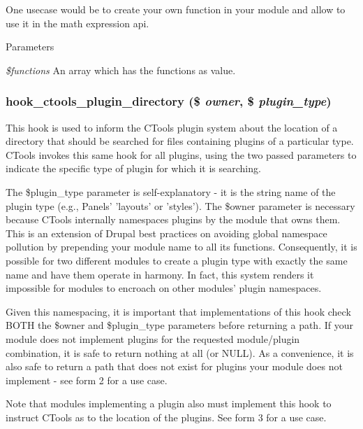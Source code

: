 One usecase would be to create your own function in your module and allow to use it in the math expression api.


\begin{DoxyParams}{Parameters}
\item[{\em \$functions}]An array which has the functions as value. \end{DoxyParams}
\hypertarget{group__hooks_gaf17a0de7a7ca6e6c30c766ea1e44715e}{
\subsubsection[{hook\_\-ctools\_\-plugin\_\-directory}]{\setlength{\rightskip}{0pt plus 5cm}hook\_\-ctools\_\-plugin\_\-directory (\$ {\em owner}, \/  \$ {\em plugin\_\-type})}}
\label{group__hooks_gaf17a0de7a7ca6e6c30c766ea1e44715e}
This hook is used to inform the CTools plugin system about the location of a directory that should be searched for files containing plugins of a particular type. CTools invokes this same hook for all plugins, using the two passed parameters to indicate the specific type of plugin for which it is searching.

The \$plugin\_\-type parameter is self-\/explanatory -\/ it is the string name of the plugin type (e.g., Panels' 'layouts' or 'styles'). The \$owner parameter is necessary because CTools internally namespaces plugins by the module that owns them. This is an extension of Drupal best practices on avoiding global namespace pollution by prepending your module name to all its functions. Consequently, it is possible for two different modules to create a plugin type with exactly the same name and have them operate in harmony. In fact, this system renders it impossible for modules to encroach on other modules' plugin namespaces.

Given this namespacing, it is important that implementations of this hook check BOTH the \$owner and \$plugin\_\-type parameters before returning a path. If your module does not implement plugins for the requested module/plugin combination, it is safe to return nothing at all (or NULL). As a convenience, it is also safe to return a path that does not exist for plugins your module does not implement -\/ see form 2 for a use case.

Note that modules implementing a plugin also must implement this hook to instruct CTools as to the location of the plugins. See form 3 for a use case.

